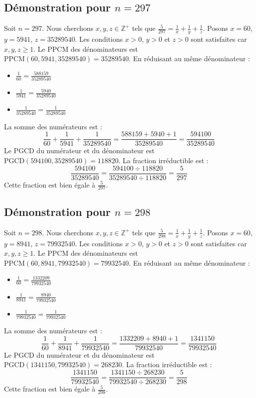 \documentclass[11pt,a4paper]{article}
\begin{document}
\subsection{Démonstration pour $n = 297$}
Soit $n = 297$. Nous cherchons $x, y, z \in \mathbb{Z}^{+}$ tels que $\frac{5}{297} = \frac{1}{x} + \frac{1}{y} + \frac{1}{z}$.
Posons $x = 60$, $y = 5941$, $z = 35289540$.
Les conditions $x > 0$, $y > 0$ et $z > 0$ sont satisfaites car $x, y, z \geq 1$.
Le PPCM des dénominateurs est $\text{PPCM}(60, 5941, 35289540) = 35289540$.
En réduisant au même dénominateur :
\begin{itemize}
    \item $\frac{1}{60} = \frac{588159}{35289540}$
    \item $\frac{1}{5941} = \frac{5940}{35289540}$
    \item $\frac{1}{35289540} = \frac{1}{35289540}$
\end{itemize}
La somme des numérateurs est :
$$ \frac{1}{60} + \frac{1}{5941} + \frac{1}{35289540} = \frac{588159 + 5940 + 1}{35289540} = \frac{594100}{35289540} $$
Le PGCD du numérateur et du dénominateur est $\text{PGCD}(594100, 35289540) = 118820$.
La fraction irréductible est :
$$ \frac{594100}{35289540} = \frac{594100 \div 118820}{35289540 \div 118820} = \frac{5}{297} $$
Cette fraction est bien égale à $\frac{5}{297}$.

\subsection{Démonstration pour $n = 298$}
Soit $n = 298$. Nous cherchons $x, y, z \in \mathbb{Z}^{+}$ tels que $\frac{5}{298} = \frac{1}{x} + \frac{1}{y} + \frac{1}{z}$.
Posons $x = 60$, $y = 8941$, $z = 79932540$.
Les conditions $x > 0$, $y > 0$ et $z > 0$ sont satisfaites car $x, y, z \geq 1$.
Le PPCM des dénominateurs est $\text{PPCM}(60, 8941, 79932540) = 79932540$.
En réduisant au même dénominateur :
\begin{itemize}
    \item $\frac{1}{60} = \frac{1332209}{79932540}$
    \item $\frac{1}{8941} = \frac{8940}{79932540}$
    \item $\frac{1}{79932540} = \frac{1}{79932540}$
\end{itemize}
La somme des numérateurs est :
$$ \frac{1}{60} + \frac{1}{8941} + \frac{1}{79932540} = \frac{1332209 + 8940 + 1}{79932540} = \frac{1341150}{79932540} $$
Le PGCD du numérateur et du dénominateur est $\text{PGCD}(1341150, 79932540) = 268230$.
La fraction irréductible est :
$$ \frac{1341150}{79932540} = \frac{1341150 \div 268230}{79932540 \div 268230} = \frac{5}{298} $$
Cette fraction est bien égale à $\frac{5}{298}$.
\end{document}

